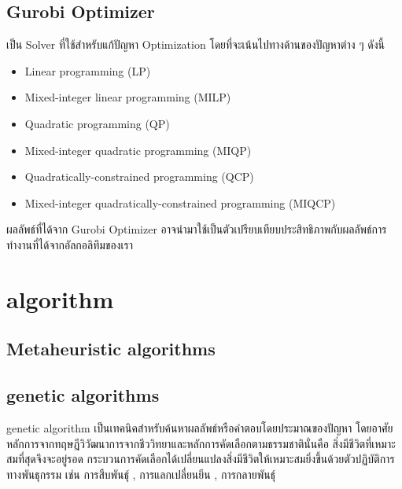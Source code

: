 \subsection{Gurobi Optimizer}
เป็น Solver ที่ใช้สำหรับแก้ปัญหา Optimization โดยที่จะเน้นไปทางด้านของปัญหาต่าง ๆ ดังนี้ 
\begin{itemize}
  \item Linear programming (LP)
  \item Mixed-integer linear programming (MILP)
  \item Quadratic programming (QP)
  \item Mixed-integer quadratic programming (MIQP)
  \item Quadratically-constrained programming (QCP)
  \item Mixed-integer quadratically-constrained programming (MIQCP)
\end{itemize}
ผลลัพธ์ที่ได้จาก Gurobi Optimizer อาจนำมาใช้เป็นตัวเปรียบเทียบประสิทธิภาพกับผลลัพธ์การทำงานที่ได้จากอัลกอลิทึมของเรา

\section{algorithm}
\subsection{Metaheuristic algorithms}
\subsection{genetic algorithms}
genetic algorithm  เป็นเทคนิคสำหรับค้นหาผลลัพธ์หรือคำตอบโดยประมาณของปัญหา โดยอาศัยหลักการจากทฤษฎีวิวัฒนาการจากชีววิทยาและหลักการคัดเลือกตามธรรมชาตินั่นคือ 
สิ่งมีชีวิตที่เหมาะสมที่สุดจึงจะอยู่รอด กระบวนการคัดเลือกได้เปลี่ยนแปลงสิ่งมีชีวิตให้เหมาะสมยิ่งขึ้นด้วยตัวปฏิบัติการทางพันธุกรรม เช่น การสืบพันธุ์ , การแลกเปลี่ยนยีน , การกลายพันธุ์  


